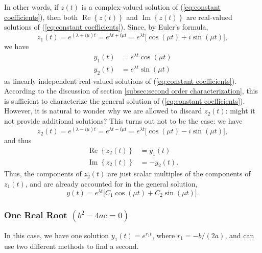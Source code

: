 \documentclass{myart}
\newcommand{\eq}[1]{(\ref{eq:#1})}
\DeclareMathOperator{\OpRe}{Re}
\DeclareMathOperator{\OpIm}{Im}
\renewcommand{\Re}[1]{\OpRe\left\{#1\right\}}
\renewcommand{\Im}[1]{\OpIm\left\{#1\right\}}
\begin{document}
In other words, if $z(t)$ is a complex-valued solution of \eq{constant
  coefficients}, then both $\Re{z(t)}$ and $\Im{z(t)}$ are real-valued
solutions of \eq{constant coefficients}. Since, by Euler's formula,
\begin{equation*}
  z_1(t) = e^{(\lambda + i\mu)t}
         = e^{\lambda t + i\mu t}
         = e^{\lambda t}\big[\cos(\mu t) + i \sin(\mu t)\big],
\end{equation*}
we have
\begin{align*}
  y_1(t) &= e^{\lambda t} \cos(\mu t) \\
  y_2(t) &= e^{\lambda t} \sin(\mu t)
\end{align*}
as linearly independent real-valued solutions of \eq{constant
  coefficients}. According to the discussion of section
\ref{subsec:second order characterization}, this is sufficient to
characterize the general solution of \eq{constant coefficients}.
However, it is natural to wonder why we are allowed to discard
$z_2(t)$: might it not provide additional solutions? This turns out
not to be the case: we have
\begin{equation*}
  z_2(t) = e^{(\lambda - i\mu)t}
         = e^{\lambda t - i\mu t}
         = e^{\lambda t} \big[\cos(\mu t) - i \sin(\mu t)\big],
\end{equation*}
and thus
\begin{align*}
  \Re{z_2(t)} &=  y_1(t) \\
  \Im{z_2(t)} &= -y_2(t).
\end{align*}
Thus, the components of $z_2(t)$ are just scalar multiples of the
components of $z_1(t)$, and are already accounted for in the general
solution,
\begin{equation*}
  y(t) = e^{\lambda t} \big[C_1 \cos(\mu t) + C_2 \sin(\mu t)\big].
\end{equation*}

\subsubsection{One Real Root
  \texorpdfstring{$(b^2 - 4ac = 0)$}{(b^2 - 4ac = 0)}}
\label{subsubsec:constant coefficients equal roots}

In this case, we have one solution $y_1(t) = e^{r_1t}$, where $r_1 =
-b/(2a)$, and can use two different methods to find a second.
\end{document}

